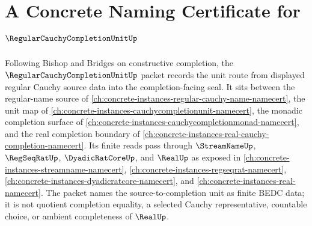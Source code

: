 \chapter{A Concrete Naming Certificate for $\RegularCauchyCompletionUnitUp$}
\label{ch:concrete-instances-regular-cauchy-completion-unit-namecert}

Following Bishop and Bridges on constructive completion, the $\RegularCauchyCompletionUnitUp$ packet records the unit route from displayed regular Cauchy source data into the completion-facing seal. It sits between the regular-name source of \autoref{ch:concrete-instances-regular-cauchy-name-namecert}, the unit map of \autoref{ch:concrete-instances-cauchycompletionunit-namecert}, the monadic completion surface of \autoref{ch:concrete-instances-cauchycompletionmonad-namecert}, and the real completion boundary of \autoref{ch:concrete-instances-real-cauchy-completion-namecert}. Its finite reads pass through $\StreamNameUp$, $\RegSeqRatUp$, $\DyadicRatCoreUp$, and $\RealUp$ as exposed in \autoref{ch:concrete-instances-streamname-namecert}, \autoref{ch:concrete-instances-regseqrat-namecert}, \autoref{ch:concrete-instances-dyadicratcore-namecert}, and \autoref{ch:concrete-instances-real-namecert}. The packet names the source-to-completion unit as finite BEDC data; it is not quotient completion equality, a selected Cauchy representative, countable choice, or ambient completeness of $\RealUp$.

